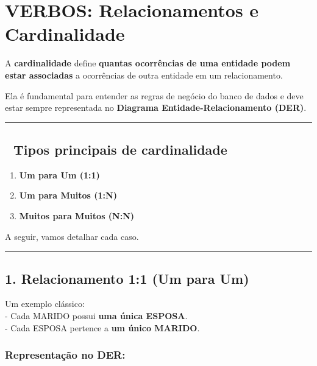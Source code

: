 \documentclass[
]{book}
\providecommand{\tightlist}{%
  \setlength{\itemsep}{0pt}\setlength{\parskip}{0pt}}
\begin{document}
\section{VERBOS: Relacionamentos e Cardinalidade}\label{verbos-relacionamentos-e-cardinalidade}

A \textbf{cardinalidade} define \textbf{quantas ocorrências de uma entidade podem estar associadas} a ocorrências de outra entidade em um relacionamento.

Ela é fundamental para entender as regras de negócio do banco de dados e deve estar sempre representada no \textbf{Diagrama Entidade-Relacionamento (DER)}.

\begin{center}\rule{0.5\linewidth}{0.5pt}\end{center}

\subsection{🔹 Tipos principais de cardinalidade}\label{tipos-principais-de-cardinalidade}

\begin{enumerate}
\def\labelenumi{\arabic{enumi}.}
\tightlist
\item
  \textbf{Um para Um (1:1)}\\
\item
  \textbf{Um para Muitos (1:N)}\\
\item
  \textbf{Muitos para Muitos (N:N)}
\end{enumerate}

A seguir, vamos detalhar cada caso.

\begin{center}\rule{0.5\linewidth}{0.5pt}\end{center}

\subsection{\texorpdfstring{1. Relacionamento \textbf{1:1 (Um para Um)}}{1. Relacionamento 1:1 (Um para Um)}}\label{relacionamento-11-um-para-um}

Um exemplo clássico:\\
- Cada MARIDO possui \textbf{uma única ESPOSA}.\\
- Cada ESPOSA pertence a \textbf{um único MARIDO}.

\subsubsection{Representação no DER:}\label{representauxe7uxe3o-no-der}
\end{document}
